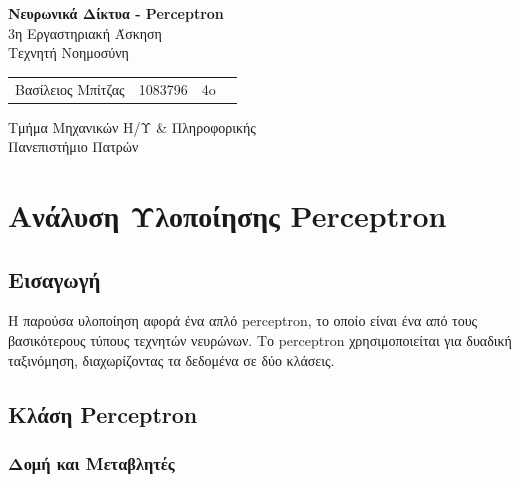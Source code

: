 \documentclass[12pt,a4paper,twoside]{book}
\begin{document}

\begin{titlepage}
	\vspace*{8cm}
	\begin{center}
		{\LARGE \textbf{Νευρωνικά Δίκτυα - Perceptron}}\\ %
		\vspace*{0.5cm}
		{\large 3η Εργαστηριακή Άσκηση}\\
		{\large Τεχνητή Νοημοσύνη}
		\vspace*{5cm}
		\\
		\vspace*{1cm}
		\begin{tabular}{l l l l}
			\large Βασίλειος Μπίτζας & \large 1083796 & \large 4o & \large
		\end{tabular}

		\vspace*{1cm}

		{\normalsize Τμήμα Μηχανικών Η/Υ \& Πληροφορικής}
		\\
		{\normalsize Πανεπιστήμιο Πατρών}
		\\
	\end{center}
	\thispagestyle{empty} %
\end{titlepage}

\let\cleardoublepage\clearpage
\frontmatter
\tableofcontents
\mainmatter %

\chapter{Ανάλυση Υλοποίησης Perceptron}

\section{Εισαγωγή}
Η παρούσα υλοποίηση αφορά ένα απλό perceptron, το οποίο είναι ένα από τους βασικότερους τύπους τεχνητών νευρώνων. Το perceptron χρησιμοποιείται για δυαδική ταξινόμηση, διαχωρίζοντας τα δεδομένα σε δύο κλάσεις.

\section{Κλάση Perceptron}

\subsection{Δομή και Μεταβλητές}
\end{document}
